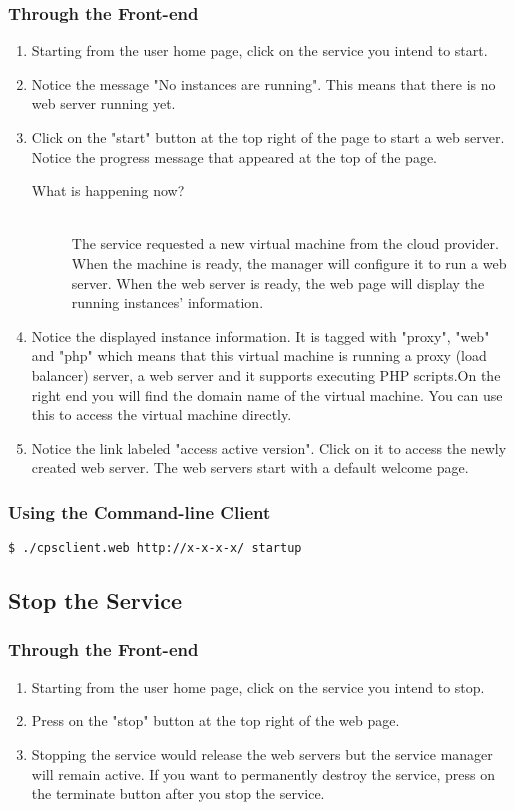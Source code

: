 \documentclass[10pt]{article}
\newenvironment{what}
{\begin{description} \item [What is happening now?] \hfill \\}
{\end{description}}
\newenvironment{framedbox}[1]%
{\begin{framed}
 \begingroup
 \fontsize{#1}{#1}\selectfont
}
{
 \endgroup
 \end{framed}
}
\begin{document}
\subsubsection{Through the Front-end}
\begin{enumerate}
\item Starting from the user home page, click on the service you intend to start.
\item Notice the message "No instances are running". This means that there is no
      web server running yet.
\item Click on the "start" button at the top right
      of the page to start a web server. Notice the progress message that
      appeared at the top of the page.
      \begin{what}
        The service requested a new virtual machine from the cloud provider.
        When the machine is ready, the manager will configure it to run
        a web server. When the web server is ready, the web page will
        display the running instances' information.
      \end{what}
\item Notice the displayed instance information. It is tagged with "proxy",
      "web" and "php" which means that this virtual machine is running a proxy
      (load balancer) server, a web server and it supports executing PHP
      scripts.On the right end you will find the domain name of the virtual
      machine. You can use this to access the virtual machine directly.
\item Notice the link labeled "access active version". Click on it to access
      the newly created web server. The web servers start with a default
      welcome page.
\end{enumerate}

\subsubsection{Using the Command-line Client}
\begin{framedbox}{8pt}\begin{verbatim}
$ ./cpsclient.web http://x-x-x-x/ startup
\end{verbatim}\end{framedbox}


\subsection{Stop the Service}
\subsubsection{Through the Front-end}
\begin{enumerate}
\item Starting from the user home page, click on the service you intend to stop.
\item Press on the "stop" button at the top right of the web page.
\item Stopping the service would release the web servers but the service
      manager will remain active. If you want to permanently destroy the
      service, press on the terminate button after you stop the service.
\end{enumerate}
\end{document}
